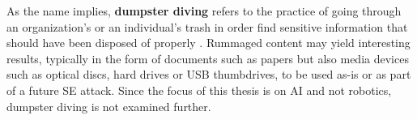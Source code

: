 
As the name implies, \textbf{dumpster diving} refers to the practice of going through an organization's or an individual's trash in order find sensitive information that should have been disposed of properly \citep{syafitri_social_2022}. Rummaged content may yield interesting results, typically in the form of documents such as papers but also media devices such as optical discs, hard drives or USB thumbdrives, to be used as-is or as part of a future SE attack. Since the focus of this thesis is on AI and not robotics, dumpster diving is not examined further.













